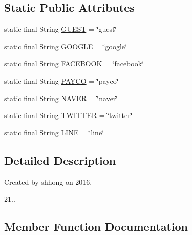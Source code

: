 \subsection*{Static Public Attributes}
\begin{DoxyCompactItemize}
\item 
static final String \hyperlink{interfacecom_1_1toast_1_1android_1_1gamebase_1_1base_1_1auth_1_1_auth_provider_ad6ed37141b7df9cc0418058144e9e03d}{G\+U\+E\+ST} = \char`\"{}guest\char`\"{}
\item 
static final String \hyperlink{interfacecom_1_1toast_1_1android_1_1gamebase_1_1base_1_1auth_1_1_auth_provider_aaab107cd127e128ea2f0049ca79472aa}{G\+O\+O\+G\+LE} = \char`\"{}google\char`\"{}
\item 
static final String \hyperlink{interfacecom_1_1toast_1_1android_1_1gamebase_1_1base_1_1auth_1_1_auth_provider_a826bfaa856a255c430303037e0c1bc7a}{F\+A\+C\+E\+B\+O\+OK} = \char`\"{}facebook\char`\"{}
\item 
static final String \hyperlink{interfacecom_1_1toast_1_1android_1_1gamebase_1_1base_1_1auth_1_1_auth_provider_a43e20142314d9728d15f5e18072cb8be}{P\+A\+Y\+CO} = \char`\"{}payco\char`\"{}
\item 
static final String \hyperlink{interfacecom_1_1toast_1_1android_1_1gamebase_1_1base_1_1auth_1_1_auth_provider_a5453310696cdf739d8000dc04ed91618}{N\+A\+V\+ER} = \char`\"{}naver\char`\"{}
\item 
static final String \hyperlink{interfacecom_1_1toast_1_1android_1_1gamebase_1_1base_1_1auth_1_1_auth_provider_aa26a8100187d9ee0ebb8deb56c7df078}{T\+W\+I\+T\+T\+ER} = \char`\"{}twitter\char`\"{}
\item 
static final String \hyperlink{interfacecom_1_1toast_1_1android_1_1gamebase_1_1base_1_1auth_1_1_auth_provider_a803a65a6dfb87b8879dc3e9cd74efae1}{L\+I\+NE} = \char`\"{}line\char`\"{}
\end{DoxyCompactItemize}


\subsection{Detailed Description}
Created by shhong on 2016. 


\begin{DoxyEnumerate}
\item 21.. 
\end{DoxyEnumerate}

\subsection{Member Function Documentation}
\mbox{\label{interfacecom_1_1toast_1_1android_1_1gamebase_1_1base_1_1auth_1_1_auth_provider_ae5d68509be41985a7f70a8fb907a576a}} 
